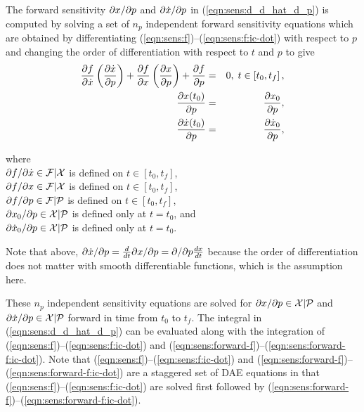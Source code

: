 \documentclass[pdf,ps2pdf,11pt]{SANDreport}
\begin{document}
The forward sensitivity $\partial x / \partial p$ and $\partial \dot{x} / \partial p$ in
(\ref{eqn:sens:d_d_hat_d_p}) is computed by solving a set of
$n_p$ independent forward sensitivity equations which are obtained by
differentiating
(\ref{eqn:sens:f})--(\ref{eqn:sens:f:ic-dot}) with
respect to $p$ and changing the order of differentiation with respect to $t$
and $p$ to give
%
\begin{eqnarray}
%
\Jac{f}{\dot{x}} \left(\Jac{\dot{x}}{p} \right) + \Jac{f}{x} \left(\Jac{x}{p}\right)
+ \Jac{f}{p} & = & 0, \; t \in \left[ t_0, t_f \right], \label{eqn:sens:forward-f} \\
\Jac{x(t_0)}{p} & = & \Jac{x_0}{p}, \label{eqn:sens:forward-f:ic} \\
\Jac{\dot{x}(t_0)}{p} & = & \Jac{\dot{x}_0}{p}, \label{eqn:sens:forward-f:ic-dot}
\end{eqnarray}
\begin{tabbing}
\hspace{4ex}where\hspace{1ex}\= \\
\>	$\partial f / \partial \dot{x} \in \mathcal{F}|\mathcal{X}$ is defined on $t\in[t_0,t_f]$, \\
\>	$\partial f / \partial x \in \mathcal{F}|\mathcal{X}$ is defined on $t\in[t_0,t_f]$, \\
\>	$\partial f / \partial p \in \mathcal{F}|\mathcal{P}$ is defined on $t\in[t_0,t_f]$, \\
\>	$\partial x_0 / \partial p \in \mathcal{X}|\mathcal{P}$ is defined only at $t=t_0$, and \\
\>	$\partial \dot{x}_0 / \partial p \in \mathcal{X}|\mathcal{P}$ is defined only at $t=t_0$.
\end{tabbing}

Note that above, $\partial \dot{x} / \partial p = \frac{d}{dt} {}\partial x / \partial p = \partial  / \partial p
{}\frac{dx}{dt}$ because the order of differentiation does not matter with
smooth differentiable functions, which is the assumption here.

These $n_p$ independent sensitivity equations are solved for $\partial x / \partial p
{}\in\mathcal{X}|\mathcal{P}$ and $\partial \dot{x} / \partial p
{}\in\mathcal{X}|\mathcal{P}$ forward in time from $t_0$ to $t_f$.  The
integral in (\ref{eqn:sens:d_d_hat_d_p}) can be evaluated along
with the integration of
(\ref{eqn:sens:f})--(\ref{eqn:sens:f:ic-dot}) and
(\ref{eqn:sens:forward-f})--(\ref{eqn:sens:forward-f:ic-dot}).
Note that (\ref{eqn:sens:f})--(\ref{eqn:sens:f:ic-dot})
and
(\ref{eqn:sens:forward-f})--(\ref{eqn:sens:forward-f:ic-dot})
are a staggered set of DAE equations in that
(\ref{eqn:sens:f})--(\ref{eqn:sens:f:ic-dot}) are solved
first followed by
(\ref{eqn:sens:forward-f})--(\ref{eqn:sens:forward-f:ic-dot}).
\end{document}
